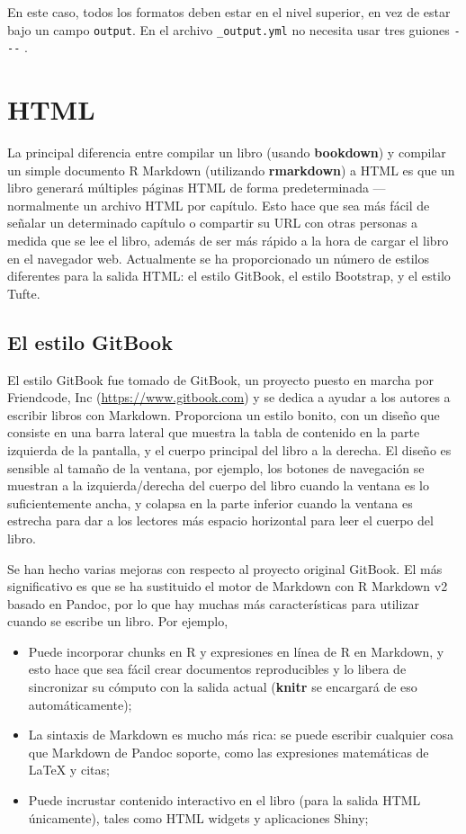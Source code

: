 \documentclass[12pt,]{krantz}
\providecommand{\tightlist}{%
  \setlength{\itemsep}{0pt}\setlength{\parskip}{0pt}}
\theoremstyle{definition}
\theoremstyle{definition}
\theoremstyle{remark}
\begin{document}
En este caso, todos los formatos deben estar en el nivel superior, en
vez de estar bajo un campo \texttt{output}. En el archivo
\texttt{\_output.yml} no necesita usar tres guiones \texttt{-\/-\/-} .

\section{HTML}\label{html}

La principal diferencia entre compilar un libro (usando
\textbf{bookdown}) y compilar un simple documento R Markdown (utilizando
\textbf{rmarkdown}) a HTML es que un libro generará múltiples páginas
HTML de forma predeterminada --- normalmente un archivo HTML por
capítulo. Esto hace que sea más fácil de señalar un determinado capítulo
o compartir su URL con otras personas a medida que se lee el libro,
además de ser más rápido a la hora de cargar el libro en el navegador
web. Actualmente se ha proporcionado un número de estilos diferentes
para la salida HTML: el estilo GitBook, el estilo Bootstrap, y el estilo
Tufte.

\subsection{El estilo GitBook}\label{estilo-gitbook}

El estilo GitBook fue tomado de GitBook, un proyecto puesto en marcha
por Friendcode, Inc (\url{https://www.gitbook.com}) y se dedica a ayudar
a los autores a escribir libros con Markdown. Proporciona un estilo
bonito, con un diseño que consiste en una barra lateral que muestra la
tabla de contenido en la parte izquierda de la pantalla, y el cuerpo
principal del libro a la derecha. El diseño es sensible al tamaño de la
ventana, por ejemplo, los botones de navegación se muestran a la
izquierda/derecha del cuerpo del libro cuando la ventana es lo
suficientemente ancha, y colapsa en la parte inferior cuando la ventana
es estrecha para dar a los lectores más espacio horizontal para leer el
cuerpo del libro.

Se han hecho varias mejoras con respecto al proyecto original GitBook.
El más significativo es que se ha sustituido el motor de Markdown con R
Markdown v2 basado en Pandoc, por lo que hay muchas más características
para utilizar cuando se escribe un libro. Por ejemplo,

\begin{itemize}
\tightlist
\item
  Puede incorporar chunks en R y expresiones en línea de R en Markdown,
  y esto hace que sea fácil crear documentos reproducibles y lo libera
  de sincronizar su cómputo con la salida actual (\textbf{knitr} se
  encargará de eso automáticamente);
\item
  La sintaxis de Markdown es mucho más rica: se puede escribir cualquier
  cosa que Markdown de Pandoc soporte, como las expresiones matemáticas
  de LaTeX y citas;
\item
  Puede incrustar contenido interactivo en el libro (para la salida HTML
  únicamente), tales como HTML widgets y aplicaciones Shiny;
\end{itemize}
\end{document}
